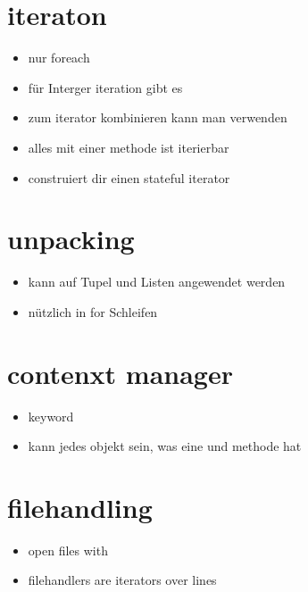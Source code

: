 \section{iteraton}
\begin{frame}
\begin{itemize}
	\item nur foreach
	\item für Interger iteration gibt es 
	\item zum iterator kombinieren kann man  verwenden
	\item alles mit einer  methode ist iterierbar
	\item {} construiert dir einen stateful iterator
\end{itemize}

\end{frame}

\section{unpacking}
\begin{frame}
\begin{itemize}
	\item kann auf Tupel und Listen angewendet werden
	\item nützlich in for Schleifen
\end{itemize}

\end{frame}

\section{contenxt manager}
\begin{frame}
\begin{itemize}
	\item keyword 
	\item kann jedes objekt sein, was eine  und  methode hat
\end{itemize}

\end{frame}

\section{filehandling}
\begin{frame}
\begin{itemize}
	\item open files with 
	\item filehandlers are iterators over lines
\end{itemize}
\end{frame}


